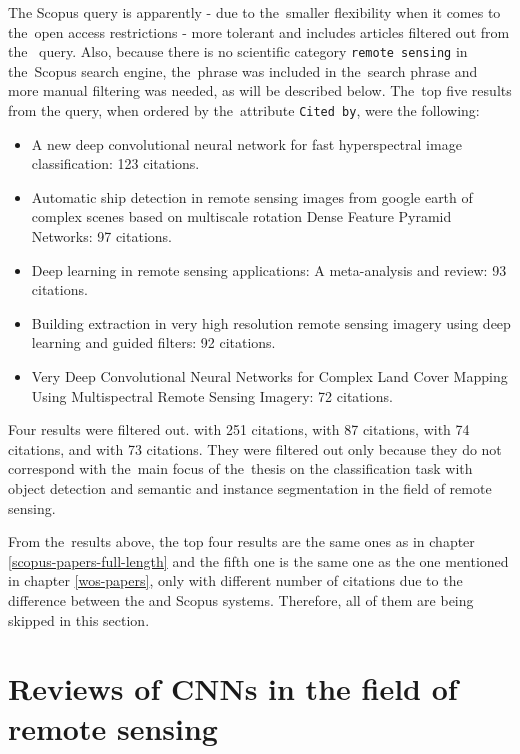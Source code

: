 \noindent The Scopus query is apparently - due to the~smaller flexibility when it comes to the~open access restrictions - more tolerant and includes articles filtered out from the~ query. Also, because there is no scientific category \verb|remote sensing| in the~Scopus search engine, the~phrase was included in the~search phrase and more manual filtering was needed, as will be described below. The~top five results from the query, when ordered by the~attribute \verb|Cited by|, were the following:

\begin{itemize}
	\item A new deep convolutional neural network for fast hyperspectral image classification: 123 citations.  \cite{cnn-hs-class}
	\item Automatic ship detection in remote sensing images from google earth of complex scenes based on multiscale rotation Dense Feature Pyramid Networks: 97 citations. \cite{ship-rdfpn}
	\item Deep learning in remote sensing applications: A meta-analysis and review: 93 citations. \cite{dl-remote-sensing-review}
	\item Building extraction in very high resolution remote sensing imagery using deep learning and guided filters: 92 citations. \cite{res-u-net}
	\item Very Deep Convolutional Neural Networks for Complex Land Cover Mapping Using Multispectral Remote Sensing Imagery: 72 citations. \cite{very-deep-cnn-lc}
\end{itemize}

Four results were filtered out. \cite{dl-for-cv} with 251 citations, \cite{dl-lungs} with 87 citations, \cite{maoxian-landslide} with 74 citations, and \cite{state-of-the-art-dl} with 73 citations. They were filtered out only because they do not correspond with the~main focus of the~thesis on the classification task with object detection and semantic and instance segmentation in the field of remote sensing.

From the~results above, the top four results are the same ones as in chapter \ref{scopus-papers-full-length} and the fifth one is the same one as the one mentioned in chapter \ref{wos-papers}, only with different number of citations due to the difference between the  and Scopus systems. Therefore, all of them are being skipped in this section.

\section{Reviews of CNNs in the field of remote sensing}
\label{situation}

